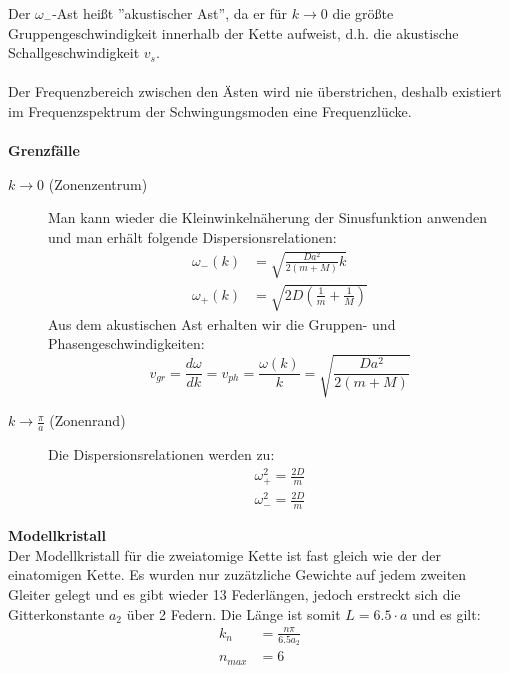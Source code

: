 \documentclass[a4paper,titlepage]{scrartcl}
\numberwithin{equation}{section}
\begin{document}
Der $\omega_{-}$-Ast heißt ''akustischer Ast'', da er für $k \rightarrow 0$ die größte Gruppengeschwindigkeit innerhalb der Kette aufweist, d.h. die akustische Schallgeschwindigkeit $v_s$.\\ \\
Der Frequenzbereich zwischen den Ästen wird nie überstrichen, deshalb existiert im Frequenzspektrum der Schwingungsmoden eine Frequenzlücke.\\ \\
\textbf{Grenzfälle}
\begin{description}
\item[$k \rightarrow 0$ (Zonenzentrum)] Man kann wieder die Kleinwinkelnäherung der Sinusfunktion anwenden und man erhält folgende Dispersionsrelationen:
\begin{align*}
\omega_{-}(k)&=\sqrt{\frac{Da^2}{2(m+M)}k}\\
\omega_{+}(k)&=\sqrt{2D \left(\frac{1}{m} + \frac{1}{M}\right)}
\end{align*}
Aus dem akustischen Ast erhalten wir die Gruppen- und Phasengeschwindigkeiten:
\begin{equation}
v_{gr}=\frac{d \omega}{dk}=v_{ph}=\frac{\omega(k)}{k}=\sqrt{\frac{Da^2}{2(m+M)}}
\label{eq:zweiatomschallgeschwindigkeit}
\end{equation}
\item[$k \rightarrow \frac{\pi}{a}$ (Zonenrand)] Die Dispersionsrelationen werden zu:
\begin{align*}
\omega_{+}^2=\frac{2D}{m}\\
\omega_{-}^2=\frac{2D}{m}
\end{align*}
\end{description}
\textbf{Modellkristall}\\
Der Modellkristall für die zweiatomige Kette ist fast gleich wie der der einatomigen Kette. Es wurden nur zuzätzliche Gewichte auf jedem zweiten Gleiter gelegt und es gibt wieder 13 Federlängen, jedoch erstreckt sich die Gitterkonstante $a_2$ über 2 Federn. Die Länge ist somit $L=6.5 \cdot a \label{eq:zweiatommodell}$ und es gilt:
\begin{align*}
k_n&=\frac{n \pi}{6.5 a_2}\\
n_{max}&=6
\end{align*}
\end{document}
